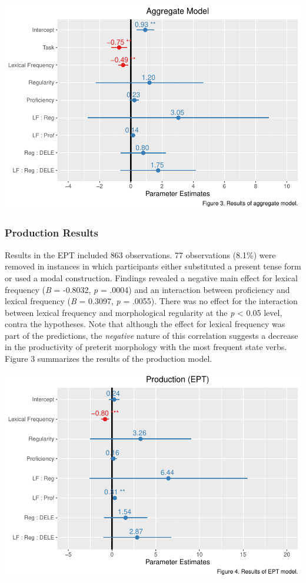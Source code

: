 \documentclass[
  english,
  man]{apa6}
\begin{document}
\includegraphics{Manuscript_files/figure-latex/aggregate-model-1.pdf}

\hypertarget{production-results}{%
\subsubsection{Production Results}\label{production-results}}

Results in the EPT included 863 observations. 77 observations (8.1\%) were removed in instances in which participants either substituted a present tense form or used a modal construction. Findings revealed a negative main effect for lexical frequency (\emph{B} = -0.8032, \emph{p} = .0004) and an interaction between proficiency and lexical frequency (\emph{B} = 0.3097, \emph{p} = .0055). There was no effect for the interaction between lexical frequency and morphological regularity at the \emph{p} \textless{} 0.05 level, contra the hypotheses. Note that although the effect for lexical frequency was part of the predictions, the \emph{negative} nature of this correlation suggests a decrease in the productivity of preterit morphology with the most frequent state verbs. Figure 3 summarizes the results of the production model.

\includegraphics{Manuscript_files/figure-latex/HB-EPT-model-1.pdf}
\end{document}
